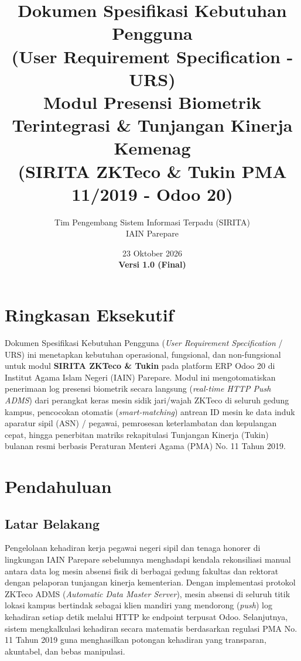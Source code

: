 \documentclass[12pt,a4paper]{article}
\title{\textbf{Dokumen Spesifikasi Kebutuhan Pengguna \\ (User Requirement Specification - URS)} \\ \large Modul Presensi Biometrik Terintegrasi \& Tunjangan Kinerja Kemenag \\ (SIRITA ZKTeco \& Tukin PMA 11/2019 - Odoo 20)}
\author{Tim Pengembang Sistem Informasi Terpadu (SIRITA) \\ IAIN Parepare}
\date{23 Oktober 2026 \\ \vspace{0.2cm} \textbf{Versi 1.0 (Final)}}
\begin{document}
\sloppy

\maketitle

\section*{Ringkasan Eksekutif}
Dokumen Spesifikasi Kebutuhan Pengguna (\textit{User Requirement Specification} / URS) ini menetapkan kebutuhan operasional, fungsional, dan non-fungsional untuk modul \textbf{SIRITA ZKTeco \& Tukin} pada platform ERP Odoo 20 di Institut Agama Islam Negeri (IAIN) Parepare. Modul ini mengotomatiskan penerimaan log presensi biometrik secara langsung (\textit{real-time HTTP Push ADMS}) dari perangkat keras mesin sidik jari/wajah ZKTeco di seluruh gedung kampus, pencocokan otomatis (\textit{smart-matching}) antrean ID mesin ke data induk aparatur sipil (ASN) / pegawai, pemrosesan keterlambatan dan kepulangan cepat, hingga penerbitan matriks rekapitulasi Tunjangan Kinerja (Tukin) bulanan resmi berbasis Peraturan Menteri Agama (PMA) No. 11 Tahun 2019.

\tableofcontents
\newpage

\section{Pendahuluan}
\subsection{Latar Belakang}
Pengelolaan kehadiran kerja pegawai negeri sipil dan tenaga honorer di lingkungan IAIN Parepare sebelumnya menghadapi kendala rekonsiliasi manual antara data log mesin absensi fisik di berbagai gedung fakultas dan rektorat dengan pelaporan tunjangan kinerja kementerian. 
Dengan implementasi protokol ZKTeco ADMS (\textit{Automatic Data Master Server}), mesin absensi di seluruh titik lokasi kampus bertindak sebagai klien mandiri yang mendorong (\textit{push}) log kehadiran setiap detik melalui HTTP ke endpoint terpusat Odoo. Selanjutnya, sistem mengkalkulasi kehadiran secara matematis berdasarkan regulasi PMA No. 11 Tahun 2019 guna menghasilkan potongan kehadiran yang transparan, akuntabel, dan bebas manipulasi.
\end{document}
